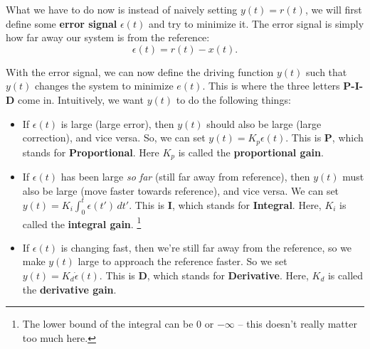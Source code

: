 \documentclass{article}
\theoremstyle{definition}
\begin{document}
What we have to do now is instead of naively setting $y(t) = r(t)$, we will first define some \textbf{error signal} $\epsilon(t)$ and try to minimize it. The error signal is simply how far away our system is from the reference:
\begin{equation*}
\epsilon(t) = r(t) - x(t).
\end{equation*}

With the error signal, we can now define the driving function $y(t)$ such that $y(t)$ changes the system to minimize $e(t)$. This is where the three letters \textbf{P-I-D} come in. Intuitively, we want $y(t)$ to do the following things:
\begin{itemize}
	\item If $\epsilon(t)$ is large (large error), then $y(t)$ should also be large (large correction), and vice versa. So, we can set $y(t) = K_p \epsilon(t)$. This is \textbf{P}, which stands for \textbf{Proportional}. Here $K_p$ is called the \textbf{proportional gain}. 
	
	
	\item If $\epsilon(t)$ has been large \textit{so far} (still far away from reference), then $y(t)$ must also be large (move faster towards reference), and vice versa. We can set $y(t) = K_i \int_0^t \epsilon(t')\,dt'$. This is \textbf{I}, which stands for \textbf{Integral}. Here, $K_i$ is called the \textbf{integral gain}. \footnote{The lower bound of the integral can be $0$ or $-\infty$ -- this doesn't really matter too much here.}
	
	
	\item If $\epsilon(t)$ is changing fast, then we're still far away from the reference, so we make $y(t)$ large to approach the reference faster. So we set $y(t)= K_d \dot{\epsilon}(t)$. This is \textbf{D}, which stands for \textbf{Derivative}. Here, $K_d$ is called the \textbf{derivative gain}. 
\end{itemize} 
\end{document}
